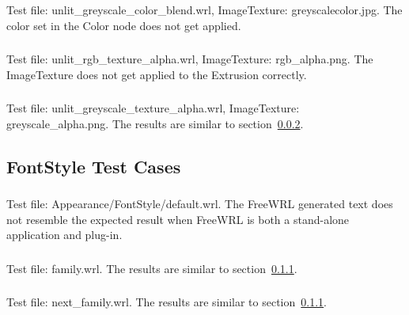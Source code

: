 \setcounter{subsubsection}{7}
\subsubsection{\AppH} 
Test file: unlit\_greyscale\_color\_blend.wrl, ImageTexture:
greyscalecolor.jpg.\newline
The color set in the Color node does not get applied.

\setcounter{subsubsection}{10}
\subsubsection{\AppK}
\label{sec:unlit-rgb-texture}
Test file: unlit\_rgb\_texture\_alpha.wrl, ImageTexture:
rgb\_alpha.png.\newline
The ImageTexture does not get applied to the Extrusion correctly.

\subsubsection{\AppL}
Test file: unlit\_greyscale\_texture\_alpha.wrl, ImageTexture:
greyscale\_alpha.png.\newline
The results are similar to section~\ref{sec:unlit-rgb-texture}.

\subsection{FontStyle Test Cases}

\subsubsection{\FSA}
\label{sec:fs-default}
Test file: Appearance/FontStyle/default.wrl.
The FreeWRL generated text does not resemble the expected result when
FreeWRL is both a stand-alone application and plug-in.

\subsubsection{\FSB}
\label{sec:3-families}
Test file: family.wrl.\newline
The results are similar to section~\ref{sec:fs-default}.

\subsubsection{\FSC}
Test file: next\_family.wrl.\newline
The results are similar to section~\ref{sec:fs-default}.

